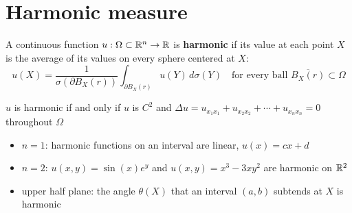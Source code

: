 \section*{Harmonic measure}

A continuous function $u:\Omega\subset\mathbb{R}^n\to\mathbb{R}$ is \textcolor{c3}{\textbf{harmonic}} if its value at each point $X$ is the average of its values on every sphere centered at $X$:
$$u(X)=\frac{1}{\sigma(\partial B_X(r))}\int_{\partial B_X(r)}u(Y)\,d\sigma(Y)\quad\text{for every ball }\overline{B_X(r)}\subset\Omega$$
\begin{theorem}{}
$u$ is harmonic if and only if $u$ is $C^2$ and $\Delta u=u_{x_1x_1}+u_{x_2x_2}+\cdots+u_{x_nx_n}=0$ throughout $\Omega$
\end{theorem}
\begin{itemize}
\item $n=1$: harmonic functions on an interval are linear, $u(x)=cx+d$
\item $n=2$: $u(x,y)=\sin(x)e^y$ and $u(x,y)=x^3-3xy^2$ are harmonic on $\mathbb{R}^2$
\item upper half plane: the angle $\theta(X)$ that an interval $(a,b)$ subtends at $X$ is harmonic
\end{itemize}

